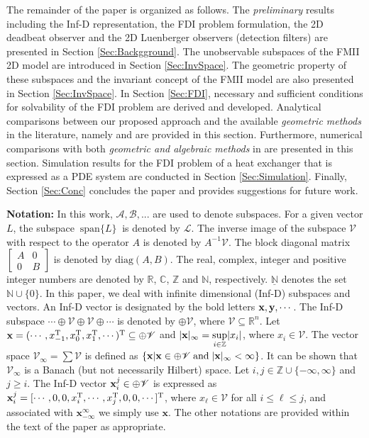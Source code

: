 \documentclass[journal,12pt,draftcls,onecolumn]{IEEEtran}
\newcommand{\tran}{\mathrm{T}}
\newcommand{\bbm}{\begin{bmatrix}}
\newcommand{\ebm}{\end{bmatrix}}
\newcommand{\diag}{\mathrm{diag}}
\newcommand{\ssp}[1]{\mathscr{#1}}      \newcommand{\setssp}[1]{\mathfrak{#1}}   \newcommand{\fld}[1]{\mathbb{#1}}       \newcommand{\op}[1]{\mathcal{#1}}       \newcommand{\sumbanach}[1]{\sum{#1}}
\newcommand{\spanset}[1]{\ \mathrm{span}\{#1\}\ } \newcommand{\idv}{{\bf x}_{-\infty}^\infty}				\newcommand{\fdv}{{\bf x}}
\begin{document}
The remainder of the paper is organized as follows. The {\it preliminary} results including the Inf-D representation, the FDI problem formulation, the 2D deadbeat observer and the 2D Luenberger observers (detection filters) are presented in Section \ref{Sec:Backgground}. The unobservable subspaces of the FMII 2D model are introduced in Section \ref{Sec:InvSpace}. The geometric property of these subspaces and the invariant concept of the FMII model are also presented in Section \ref{Sec:InvSpace}. In Section \ref{Sec:FDI}, necessary and sufficient conditions for solvability of the FDI problem are derived and developed. Analytical comparisons between our proposed approach and the available \emph{geometric methods} in the literature, namely  \cite{Malek_3DFDI} and \cite{Malek_3DFDIConf} are provided in this section. Furthermore,  numerical comparisons with both \textit{geometric and algebraic methods} in \cite{Malek_3DFDI,Malek_3DFDIConf,BisiaccoMultiDim,BisiaccoLetter} are presented in this section. Simulation results for the FDI problem of a heat exchanger that is expressed as a PDE system are conducted in Section \ref{Sec:Simulation}. Finally, Section \ref{Sec:Conc} concludes the paper and provides suggestions for future work.

{\bf Notation:}
In this work, $\mathscr{A},\mathscr{B},...$ are used to denote subspaces. For a given vector $L$, the subspace $\spanset{L}$ is denoted by $\ssp{L}$. The inverse image of the subspace $\ssp{V}$ with respect to the operator $A$ is denoted by $A^{-1}\ssp{V}$. The block diagonal matrix $\bbm A&0\\0 &B\ebm$ is denoted by $\diag(A,B)$. The real, complex, integer and positive integer numbers are denoted by $\fld{R}$, $\fld{C}$, $\fld{Z}$ and $\fld{N}$, respectively. $\underline{\fld{N}}$ denotes the set $\fld{N}\cup \{0\}$. In this paper, we deal with infinite dimensional (Inf-D) subspaces and vectors. An Inf-D vector is designated by the bold letters ${\bf x},{\bf y},\cdots$. The Inf-D subspace $\cdots\oplus\ssp{V}\oplus\ssp{V}\oplus\cdots$ is denoted by $\oplus\ssp{V}$, where $\ssp{V}\subseteq\fld{R}^n$. Let ${\bf x} =(\cdots,x_{-1}^\tran,x_0^\tran,x_1^\tran,\cdots)^\tran\subseteq\oplus\ssp{V}$ and  $|{\bf x}|_\infty = \underset{i\in\fld{Z}}{\text{sup}} |x_i|$, where $x_i\in\ssp{V}$. The vector space $\ssp{V}_\infty = \sumbanach{\ssp{V}}$ is defined as $\{{\bf x}|{\bf x}\in\oplus\ssp{V}\;\mathrm{and}\; |{\bf x}|_\infty<\infty\}$. It can be shown that $\ssp{V}_\infty$ is a Banach (but not necessarily Hilbert) space.  Let $i,j\in\fld{Z}\cup\{-\infty,\infty\}$ and $j\geq i$. The Inf-D vector ${\bf x}_i^j\in\oplus\ssp{V}$ is expressed as ${\bf x}_i^j=[\cdots,0, 0, x_i^\tran,\cdots, x_j^\tran,0 ,0,\cdots]^\tran$, where $x_\ell\in\ssp{V}$ for all $i\leq\ell\leq j$, and associated with $\textbf{x}_{-\infty}^\infty$ we simply  use $\textbf{x}$. The other notations are provided within the text of the paper as appropriate.
\end{document}
